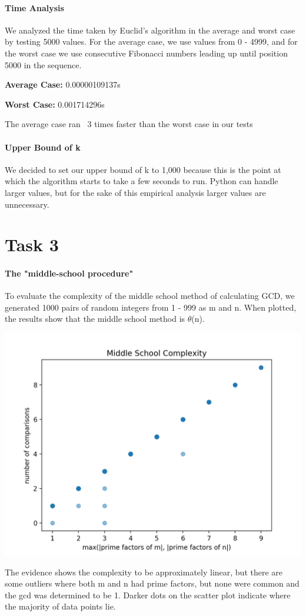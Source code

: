 \documentclass{report}
\begin{document}
\begin{flushleft}
		\paragraph{Time Analysis}

		We analyzed the time taken by Euclid's algorithm in the average and worst case by testing 5000 values. For the average case,
		we use values from 0 - 4999, and for the worst case we use consecutive Fibonacci numbers leading up until 
		position 5000 in the sequence.
		
		\textbf{Average Case:} 0.00000109137s

		\textbf{Worst Case: } 0.001714296s

		The average case ran ~3 times faster than the worst case in our tests

		\paragraph{Upper Bound of k} We decided to set our upper bound of k to 1,000 because this is the point 
		at which the algorithm starts to take a few seconds to run. Python can handle larger values, but for the sake
		of this empirical analysis larger values are unnecessary.

		\section{Task 3}

		\paragraph{The "middle-school procedure"}
		To evaluate the complexity of the middle school method of calculating GCD, we generated 1000 pairs of random integers from 1 - 999 as m and n. When plotted, the results
		show that the middle school method is $\theta$(n).

		\includegraphics{task3}

		The evidence shows the complexity to be approximately linear, but there are some outliers where 
		both m and n had prime factors, but none were common and the gcd was determined to be 1. Darker dots on the
		scatter plot indicate where the majority of data points lie.


	\end{flushleft}
\end{document}
